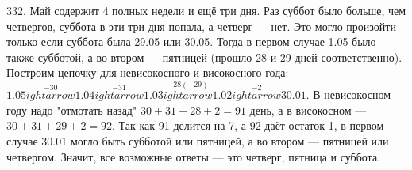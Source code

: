 332. Май содержит 4 полных недели и ещё три дня. Раз суббот было больше, чем четвергов, суббота в эти три дня попала, а четверг --- нет. Это могло произойти только если суббота была 29.05 или 30.05. Тогда в первом случае 1.05 было также субботой, а во втором --- пятницей (прошло 28 и 29 дней соответственно). Построим цепочку для невисокосного и високосного года: $1.05\stackrel{-30}{
ightarrow}1.04\stackrel{-31}{
ightarrow}1.03
\stackrel{-28(-29)}{
ightarrow}1.02\stackrel{-2}{
ightarrow}30.01.$
В невисокосном году надо "отмотать назад" $30+31+28+2=91$ день, а в високосном --- $30+31+29+2=92.$ Так как 91 делится на 7, а 92 даёт остаток 1, в первом случае 30.01 могло быть субботой или пятницей, а во втором --- пятницей или четвергом. Значит, все возможные ответы --- это четверг, пятница и суббота.\\
